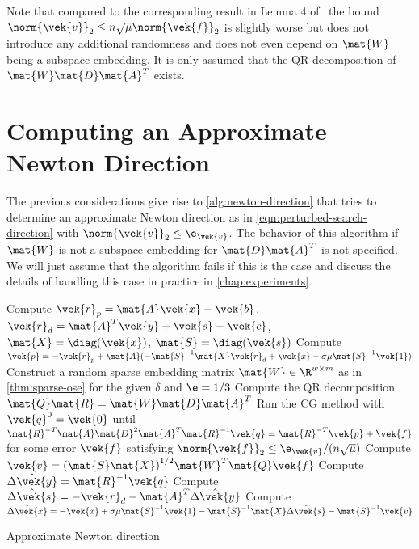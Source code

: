 Note that compared to the corresponding result in Lemma 4 of~\cite{Avron-FasterRandomizedInfeasibleIPMs} the bound \(\norm{\vek{v}}_2 \leq n \sqrt{\mu} \norm{\vek{f}}_2\) is slightly worse but does not introduce any additional randomness and does not even depend on \(\mat{W}\) being a subspace embedding.
It is only assumed that the QR decomposition of \(\mat{W}\mat{D}\mat{A}^T\) exists.

\section{Computing an Approximate Newton Direction}\label{sec:sketching-approximate-newton}

The previous considerations give rise to \cref{alg:newton-direction} that tries to determine an approximate Newton direction as in \cref{eqn:perturbed-search-direction} with \(\norm{\vek{v}}_2 \leq \e_{\vek{v}}\).
The behavior of this algorithm if \(\mat{W}\) is not a subspace embedding for \(\mat{D}\mat{A}^T\) is not specified.
We will just assume that the algorithm fails if this is the case and discuss the details of handling this case in practice in \cref{chap:experiments}.

\begin{algorithm}
  Compute \(\vek{r}_p = \mat{A}\vek{x} - \vek{b}\), \(\vek{r}_d = \mat{A}^T \vek{y} + \vek{s} - \vek{c}\), \(\mat{X} = \diag(\vek{x})\), \(\mat{S} = \diag(\vek{s})\)\;\label{line:compute-residuals}
  Compute \(\vek{p} = -\vek{r}_p + \mat{A}(-\mat{S}^{-1}\mat{X}\vek{r}_d + \vek{x} - \sigma \mu \mat{S}^{-1} \vek{1})\)\;\label{line:compute-p}
  Construct a random sparse embedding matrix \(\mat{W} \in \R^{w \times m}\) as in \cref{thm:sparse-ose} for the given \(\delta\) and \(\e = 1/3\)\;\label{line:draw-sketching-matrix}
  Compute the QR decomposition \(\mat{Q} \mat{R} = \mat{W} \mat{D} \mat{A}^T\)\;\label{line:compute-qr}
  Run the CG method with \(\vek{q}^0 = \vek{0}\) until \(\mat{R}^{-T} \mat{A} \mat{D}^2 \mat{A}^T \mat{R}^{-1} \vek{q} = \mat{R}^{-T} \vek{p} + \vek{f}\) for some error \(\vek{f}\) satisfying \(\norm{\vek{f}}_2 \leq \e_{\vek{v}}/(n \sqrt{\mu})\)\;\label{line:cg}
  Compute \(\vek{v} = {(\mat{S} \mat{X})}^{1/2} \mat{W}^T \mat{Q} \vek{f}\)\;\label{line:compute-v}
  Compute \(\hat{\Delta\vek{y}} = \mat{R}^{-1}\vek{q}\)\;\label{line:compute-delta-y}
  Compute \(\hat{\Delta\vek{s}} = -\vek{r}_d - \mat{A}^T \hat{\Delta\vek{y}}\)\;\label{line:compute-delta-s}
  Compute \(\hat{\Delta\vek{x}} = -\vek{x} + \sigma \mu \mat{S}^{-1} \vek{1} - \mat{S}^{-1}\mat{X} \hat{\Delta\vek{s}} - \mat{S}^{-1} \vek{v}\)\;\label{line:compute-delta-x}
  \;
  \caption{Approximate Newton direction}\label{alg:newton-direction}
\end{algorithm}

